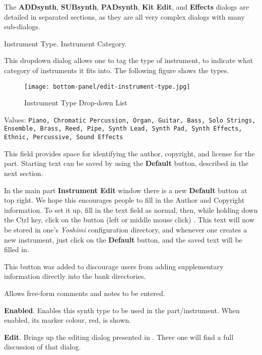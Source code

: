    The \textbf{ADDsynth}, \textbf{SUBsynth}, \textbf{PADsynth},
   \textbf{Kit Edit}, and \textbf{Effects}
   dialogs are detailed in separated sections, as they are all
   very complex dialogs with many sub-dialogs.

   \setcounter{ItemCounter}{0}      %

   Instrument Type.
   Instrument Category.

   This dropdown dialog allows one to tag the type of instrument, to
   indicate what category of instruments it fits into.
   The following figure shows the types.

\begin{figure}[H]
   \centering
   \texttt{[image: bottom-panel/edit-instrument-type.jpg]}
   \caption{Instrument Type Drop-down List}
   \label{fig:instrument_type_dropdown}
\end{figure}

   Values: \texttt{Piano, Chromatic Percussion, Organ, Guitar, Bass,
              Solo Strings, Ensemble, Brass, Reed, Pipe,
              Synth Lead, Synth Pad, Synth Effects, Ethnic,
              Percussive, Sound Effects}

   This field provides space for identifying the author, copyright, and
   license for the part.  Starting text can be saved by using the
   \textbf{Default} button, described in the next section.

   In the main part \textbf{Instrument Edit} window there is a new
   \textbf{Default} button at top right.
   We hope this encourages people
   to fill in the Author and Copyright information.
   To set it up, fill in the text field as normal,
   then, while holding down the Ctrl key, click on the button
   (left or middle mouse click) . This text will now be stored in
   one's \textsl{Yoshimi} configuration directory,
   and whenever one creates a new instrument, just
   click on the \textbf{Default} button, and the saved text will be
   filled in.

   This button was added to discourage users from adding supplementary
   information directly into the bank directories.

   Allows free-form comments and notes to be entered.


   \begin{enumber}
      \item \textbf{Enabled}.
      Enables this synth type to be used in the part/instrument.
      When enabled, its marker colour, red, is shown.
      \item \textbf{Edit}.
      Brings up the editing dialog presented in
      .
      There one will find a full discussion of that dialog.
   \end{enumber}

